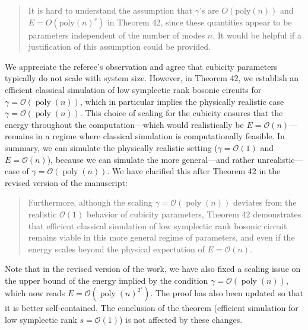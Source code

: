 \documentclass[a4paper,12pt]{article}
\newenvironment{Referee}[1]
{\noindent {\bf Comment #1:} \begin{quote} }
{\end{quote}\vspace{0 cm}}
\newenvironment{Response}
{\noindent \color{RawSienna}{\bf Response:} }
{\vspace{0.4 cm}}
\newcommand{\poly}{\operatorname{poly}}
\begin{document}
\begin{Referee}{5}
It is hard to understand the assumption that $\gamma$'s are $O(\text{poly}(n))$ and $E=O(\text{poly}(n)^s)$ in Theorem 42, since these quantities appear to be parameters independent of the number of modes $n$. It would be helpful if a justification of this assumption could be provided.
\end{Referee}
\begin{Response}
    We appreciate the referee’s observation and agree that cubicity parameters typically do not scale with system size. However, in Theorem 42, we establish an efficient classical simulation of low symplectic rank bosonic circuits for $\gamma = \mathcal{O}(\poly(n))$, which in particular implies the physically realistic case $\gamma = \mathcal{O}(\poly(n))$. This choice of scaling for the cubicity ensures that the energy throughout the computation---which would realistically be $E = \mathcal{O}(n)$---remains in a regime where classical simulation is computationally feasible. In summary, we can simulate the physically realistic setting ($\gamma=\mathcal{O}(1)$ and $E=\mathcal{O}(n)$), because we can simulate the more general---and rather unrealistic---case of $\gamma = \mathcal{O}(\poly(n))$. We have clarified this after Theorem 42 in the revised version of the manuscript:
\begin{quote}
    Furthermore, although the scaling $\gamma = \mathcal{O}(\poly(n))$ deviates from the realistic $\mathcal{O}(1)$ behavior of cubicity parameters, Theorem 42 demonstrates that efficient classical simulation of low symplectic rank bosonic circuit remains viable in this more general regime of parameters, and even if the energy scales beyond the physical expectation of $E = \mathcal{O}(n)$.
\end{quote}
Note that in the revised version of the work, we have also fixed a scaling issue on the upper bound of the energy implied by the condition $\gamma=\mathcal O(\poly(n))$, which now reads $E=\mathcal O(\poly(n)^{2^s})$. The proof has also been updated so that it is better self-contained. The conclusion of the theorem (efficient simulation for low symplectic rank $s=\mathcal O(1)$) is not affected by these changes.
\end{Response}
\printbibliography


\section{}
\end{document}
